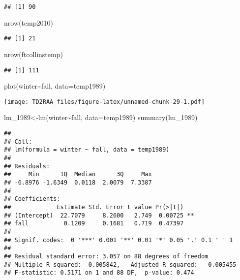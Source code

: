 \documentclass[
]{article}
\newenvironment{Shaded}{\begin{snugshade}}{\end{snugshade}}
\newcommand{\AttributeTok}[1]{\textcolor[rgb]{0.77,0.63,0.00}{#1}}
\newcommand{\FunctionTok}[1]{\textcolor[rgb]{0.00,0.00,0.00}{#1}}
\newcommand{\NormalTok}[1]{#1}
\newcommand{\OtherTok}[1]{\textcolor[rgb]{0.56,0.35,0.01}{#1}}
\newcommand{\SpecialCharTok}[1]{\textcolor[rgb]{0.00,0.00,0.00}{#1}}
\begin{document}
\begin{verbatim}
## [1] 90
\end{verbatim}

\begin{Shaded}
\begin{Highlighting}[]
\FunctionTok{nrow}\NormalTok{(temp2010)}
\end{Highlighting}
\end{Shaded}

\begin{verbatim}
## [1] 21
\end{verbatim}

\begin{Shaded}
\begin{Highlighting}[]
\FunctionTok{nrow}\NormalTok{(ftcollinstemp)}
\end{Highlighting}
\end{Shaded}

\begin{verbatim}
## [1] 111
\end{verbatim}

\begin{Shaded}
\begin{Highlighting}[]
\FunctionTok{plot}\NormalTok{(winter}\SpecialCharTok{\textasciitilde{}}\NormalTok{fall, }\AttributeTok{data=}\NormalTok{temp1989)}
\end{Highlighting}
\end{Shaded}

\texttt{[image: TD2RAA\_files/figure-latex/unnamed-chunk-29-1.pdf]}

\begin{Shaded}
\begin{Highlighting}[]
\NormalTok{lm\_1989}\OtherTok{\textless{}{-}}\FunctionTok{lm}\NormalTok{(winter}\SpecialCharTok{\textasciitilde{}}\NormalTok{fall, }\AttributeTok{data=}\NormalTok{temp1989)}
\FunctionTok{summary}\NormalTok{(lm\_1989)}
\end{Highlighting}
\end{Shaded}

\begin{verbatim}
## 
## Call:
## lm(formula = winter ~ fall, data = temp1989)
## 
## Residuals:
##     Min      1Q  Median      3Q     Max 
## -6.8976 -1.6349  0.0118  2.0079  7.3387 
## 
## Coefficients:
##             Estimate Std. Error t value Pr(>|t|)   
## (Intercept)  22.7079     8.2600   2.749  0.00725 **
## fall          0.1209     0.1681   0.719  0.47397   
## ---
## Signif. codes:  0 '***' 0.001 '**' 0.01 '*' 0.05 '.' 0.1 ' ' 1
## 
## Residual standard error: 3.057 on 88 degrees of freedom
## Multiple R-squared:  0.005842,   Adjusted R-squared:  -0.005455 
## F-statistic: 0.5171 on 1 and 88 DF,  p-value: 0.474
\end{verbatim}
\end{document}
